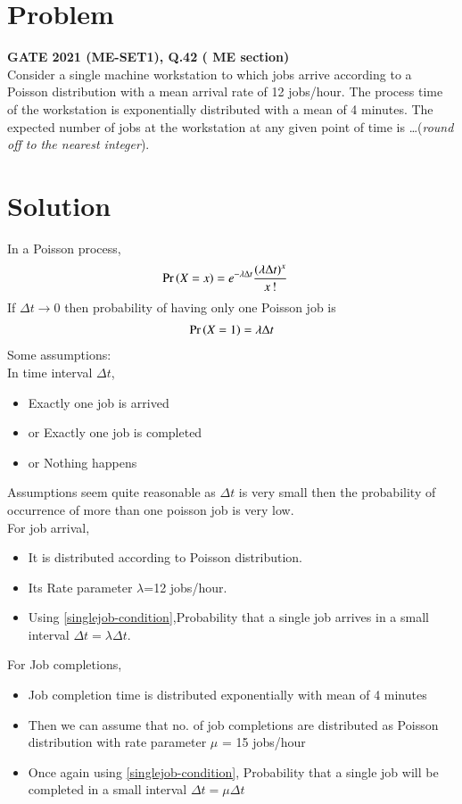 \documentclass[journal,12pt,twocolumn]{IEEEtran}
\begin{document}
\section{Problem}
\textbf{GATE 2021 (ME-SET1), Q.42 ( ME section)}\\  
   Consider a single machine workstation to which jobs arrive according to a
Poisson distribution with a mean arrival rate of 12 jobs/hour. The process
time of the workstation is exponentially distributed with a mean of 4
minutes. The expected number of jobs at the workstation at any given
point of time is \ldots (\textit{round off to the nearest integer}).
\section{Solution}
In a Poisson process,
 \begin{align}
          \Pr\left(X=x\right)&= e^{-\lambda \Delta t} \frac{(\lambda \Delta t)^{x}}{x\,!}
 \end{align}
If $\Delta t \rightarrow 0$ then probability of having only one Poisson job is  
  \begin{align}
         \Pr\left(X=1\right)=\lambda \Delta t \label{singlejob-condition}
 \end{align}
 Some assumptions:\\
 In time interval $\Delta t$,
 \begin{itemize}
     \item Exactly one job is arrived  
     \item or Exactly one job is completed
     \item or Nothing happens
 \end{itemize}
Assumptions seem quite reasonable as $\Delta t$ is very small then the probability of occurrence of more than one poisson job is very low.\\
 For job arrival,
 \begin{itemize}
 \item It is distributed according to Poisson distribution.
     \item Its
 Rate parameter $\lambda $=12 jobs/hour.
 \item Using \eqref{singlejob-condition},Probability that a single job arrives in a small interval $\Delta t=\lambda\Delta t$.
 \end{itemize}
 For Job completions,
 \begin{itemize}
     \item  Job completion time is distributed exponentially with mean of 4 minutes 
     \item Then we can assume that no. of job completions are distributed as Poisson distribution with rate parameter $\mu$ = 15 jobs/hour
     \item Once again using \eqref{singlejob-condition},
 Probability that a single job will be completed in a small interval $\Delta t=\mu \Delta t$
 \end{itemize}
\end{document}
